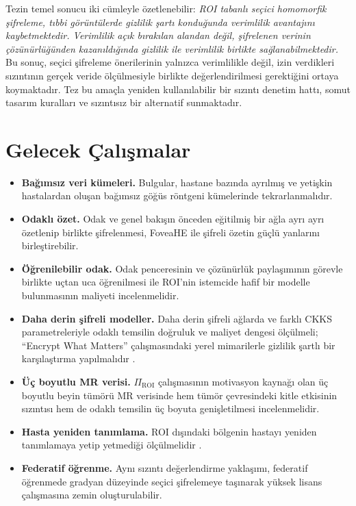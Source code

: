 Tezin temel sonucu iki cümleyle özetlenebilir: \emph{ROI tabanlı seçici homomorfik şifreleme, tıbbi görüntülerde gizlilik şartı konduğunda verimlilik avantajını kaybetmektedir. Verimlilik açık bırakılan alandan değil, şifrelenen verinin çözünürlüğünden kazanıldığında gizlilik ile verimlilik birlikte sağlanabilmektedir.} Bu sonuç, seçici şifreleme önerilerinin yalnızca verimlilikle değil, izin verdikleri sızıntının gerçek veride ölçülmesiyle birlikte değerlendirilmesi gerektiğini ortaya koymaktadır. Tez bu amaçla yeniden kullanılabilir bir sızıntı denetim hattı, somut tasarım kuralları ve sızıntısız bir alternatif sunmaktadır.

\section{Gelecek Çalışmalar}\label{sec:gelecek}

\begin{itemize}
\item \textbf{Bağımsız veri kümeleri.} Bulgular, hastane bazında ayrılmış ve yetişkin hastalardan oluşan bağımsız göğüs röntgeni kümelerinde tekrarlanmalıdır.
\item \textbf{Odaklı özet.} Odak ve genel bakışın önceden eğitilmiş bir ağla ayrı ayrı özetlenip birlikte şifrelenmesi, FoveaHE ile şifreli özetin güçlü yanlarını birleştirebilir.
\item \textbf{Öğrenilebilir odak.} Odak penceresinin ve çözünürlük paylaşımının görevle birlikte uçtan uca öğrenilmesi ile ROI'nin istemcide hafif bir modelle bulunmasının maliyeti incelenmelidir.
\item \textbf{Daha derin şifreli modeller.} Daha derin şifreli ağlarda ve farklı CKKS parametreleriyle odaklı temsilin doğruluk ve maliyet dengesi ölçülmeli; ``Encrypt What Matters'' çalışmasındaki yerel mimarilerle gizlilik şartlı bir karşılaştırma yapılmalıdır \cite{backour2026encrypt}.
\item \textbf{Üç boyutlu MR verisi.} $\Pi_{\mathrm{ROI}}$ çalışmasının motivasyon kaynağı olan üç boyutlu beyin tümörü MR verisinde hem tümör çevresindeki kitle etkisinin sızıntısı hem de odaklı temsilin üç boyuta genişletilmesi incelenmelidir.
\item \textbf{Hasta yeniden tanımlama.} ROI dışındaki bölgenin hastayı yeniden tanımlamaya yetip yetmediği ölçülmelidir \cite{packhauser2022reid}.
\item \textbf{Federatif öğrenme.} Aynı sızıntı değerlendirme yaklaşımı, federatif öğrenmede gradyan düzeyinde seçici şifrelemeye taşınarak yüksek lisans çalışmasına zemin oluşturulabilir.
\end{itemize}
